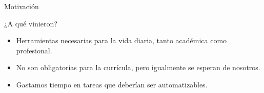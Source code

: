 \begin{frame}{Motivación}

    \begin{block}{¿A qué vinieron?}
        \begin{itemize}
            \item Herramientas necesarias para la vida diaria, tanto académica como profesional.
            \pause
            \item No son obligatorias para la currícula, pero igualmente se esperan de nosotros.
            \pause
            \item Gastamos tiempo en tareas que deberían ser automatizables.
        \end{itemize}
    \end{block} 
    
\end{frame}

